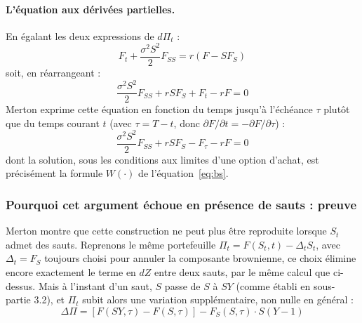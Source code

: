 \documentclass{article}
\begin{document}
\paragraph{L'équation aux dérivées partielles.} En égalant les deux expressions de $d\Pi_t$ :
\begin{equation}
F_t + \frac{\sigma^2 S^2}{2} F_{SS} = r\left(F - S F_S\right)
\end{equation}
soit, en réarrangeant :
\begin{equation}
\frac{\sigma^2 S^2}{2} F_{SS} + rS F_S + F_t - rF = 0
\end{equation}
Merton exprime cette équation en fonction du temps jusqu'à l'échéance $\tau$ plutôt que du temps courant $t$ (avec $\tau = T-t$, donc $\partial F/\partial t = -\partial F/\partial \tau$) :
\begin{equation}
\frac{\sigma^2 S^2}{2} F_{SS} + rS F_S - F_\tau - rF = 0
\label{eq:bs_pde}
\end{equation}
dont la solution, sous les conditions aux limites d'une option d'achat, est précisément la formule $W(\cdot)$ de l'équation~\eqref{eq:bs}.
\subsubsection*{Pourquoi cet argument échoue en présence de sauts : preuve}
Merton montre que cette construction ne peut plus être reproduite lorsque $S_t$ admet des sauts. Reprenons le même portefeuille $\Pi_t = F(S_t,t) - \Delta_t S_t$, avec $\Delta_t = F_S$ toujours choisi pour annuler la composante brownienne, ce choix élimine encore exactement le terme en $dZ$ entre deux sauts, par le même calcul que ci-dessus. Mais à l'instant d'un saut, $S$ passe de $S$ à $SY$ (comme établi en sous-partie 3.2), et $\Pi_t$ subit alors une variation supplémentaire, non nulle en général :
\begin{equation}
\Delta\Pi = \left[F(SY,\tau) - F(S,\tau)\right] - F_S(S,\tau) \cdot S(Y-1)
\label{eq:jump_residual}
\end{equation}
\end{document}
